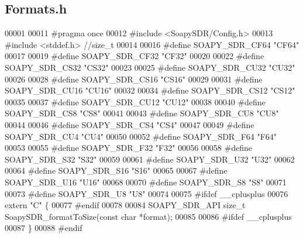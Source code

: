 \subsection{Formats.\+h}
\label{Formats_8h_source}

\begin{DoxyCode}
00001 
00011 \textcolor{preprocessor}{#pragma once}
00012 \textcolor{preprocessor}{#include <SoapySDR/Config.h>}
00013 \textcolor{preprocessor}{#include <stddef.h>} \textcolor{comment}{//size\_t}
00014 
00016 \textcolor{preprocessor}{#define SOAPY\_SDR\_CF64 "CF64"}
00017 
00019 \textcolor{preprocessor}{#define SOAPY\_SDR\_CF32 "CF32"}
00020 
00022 \textcolor{preprocessor}{#define SOAPY\_SDR\_CS32 "CS32"}
00023 
00025 \textcolor{preprocessor}{#define SOAPY\_SDR\_CU32 "CU32"}
00026 
00028 \textcolor{preprocessor}{#define SOAPY\_SDR\_CS16 "CS16"}
00029 
00031 \textcolor{preprocessor}{#define SOAPY\_SDR\_CU16 "CU16"}
00032 
00034 \textcolor{preprocessor}{#define SOAPY\_SDR\_CS12 "CS12"}
00035 
00037 \textcolor{preprocessor}{#define SOAPY\_SDR\_CU12 "CU12"}
00038 
00040 \textcolor{preprocessor}{#define SOAPY\_SDR\_CS8 "CS8"}
00041 
00043 \textcolor{preprocessor}{#define SOAPY\_SDR\_CU8 "CU8"}
00044 
00046 \textcolor{preprocessor}{#define SOAPY\_SDR\_CS4 "CS4"}
00047 
00049 \textcolor{preprocessor}{#define SOAPY\_SDR\_CU4 "CU4"}
00050 
00052 \textcolor{preprocessor}{#define SOAPY\_SDR\_F64 "F64"}
00053 
00055 \textcolor{preprocessor}{#define SOAPY\_SDR\_F32 "F32"}
00056 
00058 \textcolor{preprocessor}{#define SOAPY\_SDR\_S32 "S32"}
00059 
00061 \textcolor{preprocessor}{#define SOAPY\_SDR\_U32 "U32"}
00062 
00064 \textcolor{preprocessor}{#define SOAPY\_SDR\_S16 "S16"}
00065 
00067 \textcolor{preprocessor}{#define SOAPY\_SDR\_U16 "U16"}
00068 
00070 \textcolor{preprocessor}{#define SOAPY\_SDR\_S8 "S8"}
00071 
00073 \textcolor{preprocessor}{#define SOAPY\_SDR\_U8 "U8"}
00074 
00075 \textcolor{preprocessor}{#ifdef \_\_cplusplus}
00076 \textcolor{keyword}{extern} \textcolor{stringliteral}{"C"} \{
00077 \textcolor{preprocessor}{#endif}
00078 
00084 SOAPY_SDR_API \textcolor{keywordtype}{size\_t} SoapySDR_formatToSize(\textcolor{keyword}{const} \textcolor{keywordtype}{char} *format);
00085 
00086 \textcolor{preprocessor}{#ifdef \_\_cplusplus}
00087 \}
00088 \textcolor{preprocessor}{#endif}
\end{DoxyCode}
